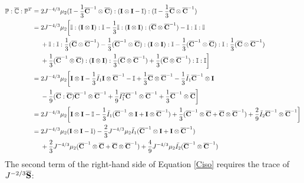 \begin{equation} \label{part11}
\begin{split}
\mathbb{P} : {\overline{\mathbb{C}}} : {\mathbb{P}}^T 
= {} & 2J^{-4/3}\mu_2 (\mathbb{I} - \frac{1}{3}{\overline{\bold{C}}}^{-1} \otimes \overline{\bold{C}})
: (\bold{I} \otimes \bold{I} - \mathbb{I}) : (\mathbb{I} - \frac{1}{3}\overline{\bold{C}} \otimes {\overline{\bold{C}}}^{-1}) \\
= {} & 2J^{-4/3}\mu_2 \bigg[\mathbb{I} : (\bold{I} \otimes \bold{I}) : \mathbb{I} - \frac{1}{3}\mathbb{I} : (\bold{I} \otimes \bold{I}) : (\overline{{\bold{C}}} \otimes {\overline{\bold{C}}}^{-1}) - \mathbb{I} : \mathbb{I} : \mathbb{I} \\
&+ \mathbb{I} : \mathbb{I} : \frac{1}{3}(\overline{\bold{C}} \otimes {\overline{\bold{C}}}^{-1}) - 
\frac{1}{3}({\overline{\bold{C}}}^{-1} \otimes \overline{\bold{C}} ) : (\bold{I} \otimes \bold{I}) : \mathbb{I}
- \frac{1}{3}({\overline{\bold{C}}}^{-1} \otimes \overline{\bold{C}} ) :  \mathbb{I} : \frac{1}{3}({\overline{\bold{C}}} \otimes {\overline{\bold{C}} }^{-1}) \\
&+ \frac{1}{3}(\overline{{\bold{C}}}^{-1} \otimes \overline{\bold{C}} ) : (\bold{I} \otimes \bold{I}) : \frac{1}{3}({\overline{\bold{C}}} \otimes {\overline{\bold{C}}}^{-1} ) + \frac{1}{3}({\overline{\bold{C}}} \otimes {\overline{\bold{C}}}^{-1}) : \mathbb{I} : \mathbb{I}
\bigg] \\
= {} & 2J^{-4/3}\mu_2 \bigg[\bold{I} \otimes \bold{I} - \frac{1}{3}\bar{I}_1\bold{I} \otimes {\overline{\bold{C}}}^{-1} - \mathbb{I} + \frac{1}{3}\overline{\bold{C}} \otimes {\overline{\bold{C}}}^{-1} -  \frac{1}{3}\bar{I}_1{\overline{\bold{C}}}^{-1} \otimes \bold{I}\\
&- \frac{1}{9}(\overline{\bold{C}} : \overline{\bold{C}}){\overline{\bold{C}}}^{-1} \otimes {\overline{\bold{C}}}^{-1} + \frac{1}{9}{\bar{I}_1}^2{\overline{\bold{C}}}^{-1} \otimes {\overline{\bold{C}}}^{-1} +  \frac{1}{3}{\overline{\bold{C}}}^{-1} \otimes {\overline{\bold{C}}} \bigg] \\
= {} & 2{J}^{-4/3}\mu_2 \bigg[ \bold{I} \otimes \bold{I} - \mathbb{I} - \frac{1}{3}\bar{I}_1({\overline{\bold{C}}}^{-1} \otimes \bold{I} + \bold{I}\otimes{\overline{\bold{C}}}^{-1} ) +
\frac{1}{3}({\overline{\bold{C}}}^{-1} \otimes \overline{\bold{C}} + \overline{\bold{C}}\otimes{\overline{\bold{C}}}^{-1} )  + \frac{2}{9}\bar{I}_2 {\overline{\bold{C}}}^{-1} \otimes {\overline{\bold{C}}}^{-1} \bigg] \\
= {} & 2{J}^{-4/3}\mu_2(\bold{I} \otimes \bold{I} - \mathbb{I}) - \frac{2}{3}J^{-4/3}\mu_2\bar{I}_1({\overline{\bold{C}}}^{-1} \otimes \bold{I} + \bold{I} \otimes {\overline{\bold{C}}}^{-1}) \\
&+
\frac{2}{3}J^{-4/3}\mu_2({\overline{\bold{C}}}^{-1} \otimes {\overline{\bold{C}}} + {\overline{\bold{C}}} \otimes {\overline{\bold{C}}}^{-1}) + \frac{4}{9}J^{-4/3}\mu_2\bar{I_2}({\overline{\bold{C}}}^{-1} \otimes {\overline{\bold{C}}}^{-1})
\end{split}
\end{equation}
The second term of the right-hand side of Equation \ref{Ciso} requires the trace of $J^{-2/3}\overline{\bold{S}}$:

